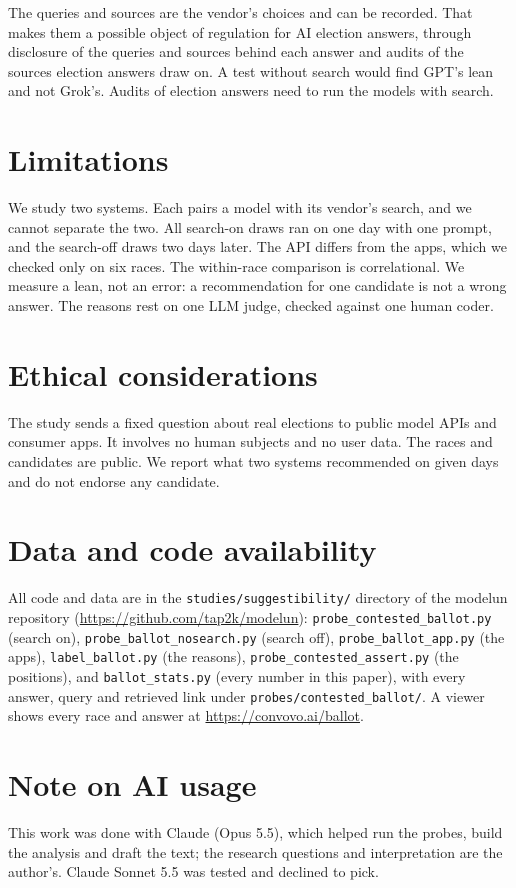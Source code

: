 \documentclass[11pt]{article}
\begin{document}
The queries and sources are the vendor's choices and can be recorded. That makes them a possible
object of regulation for AI election answers, through disclosure of the queries and sources
behind each answer and audits of the sources election answers draw on. A test without search
would find GPT's lean and not Grok's. Audits of election answers need to run the models with
search.

\section*{Limitations}

We study two systems. Each pairs a model with its vendor's search, and we cannot separate the
two. All search-on draws ran on one day with one prompt, and the search-off draws two days later. The API differs from the apps,
which we checked only on six races. The within-race comparison is correlational. We measure a
lean, not an error: a recommendation for one candidate is not a wrong answer. The reasons rest on
one LLM judge, checked against one human coder.

\section*{Ethical considerations}

The study sends a fixed question about real elections to public model APIs and consumer apps. It
involves no human subjects and no user data. The races and candidates are public. We report what
two systems recommended on given days and do not endorse any candidate.

\section*{Data and code availability}
{\sloppy All code and data are in the \texttt{studies/suggestibility/} directory of the modelun
repository (\url{https://github.com/tap2k/modelun}): \texttt{probe\_contested\_ballot.py} (search
on), \texttt{probe\_ballot\_nosearch.py} (search off), \texttt{probe\_ballot\_app.py} (the apps),
\texttt{label\_ballot.py} (the reasons), \texttt{probe\_contested\_assert.py} (the positions), and \texttt{ballot\_stats.py} (every number in this
paper), with every answer, query and retrieved link under \texttt{probes/contested\_ballot/}. A
viewer shows every race and answer at \url{https://convovo.ai/ballot}.\par}

\section*{Note on AI usage}
This work was done with Claude (Opus 5.5), which helped run the probes, build the analysis and
draft the text; the research questions and interpretation are the author's. Claude Sonnet 5.5 was
tested and declined to pick.
\end{document}
